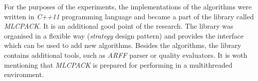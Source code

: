 For the purposes of the experiments, the implementations of the algorithms were written in \textit{C++11} programming language and became a part of the library called \textit{MLCPACK}. It is an additional good point of the research. The library was organised in a flexible way (\textit{strategy} design pattern) and provides the interface which can be used to add new algorithms. Besides the algorithms, the library contains additional tools, such as \textit{ARFF} parser or quality evaluators. It is woth mentioning that \textit{MLCPACK} is prepared for performing in a multithreaded environment.
